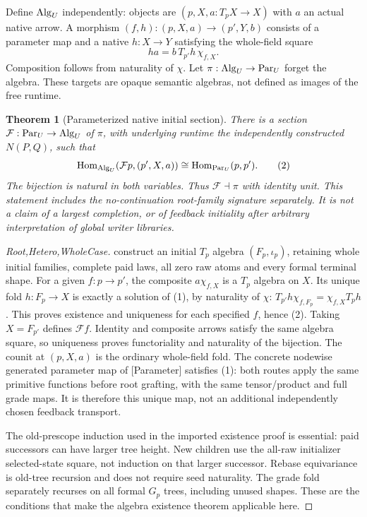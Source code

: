 \documentclass[11pt]{article}
\newtheorem{theorem}{Theorem}\newtheorem{lemma}[theorem]{Lemma}\newtheorem{proposition}[theorem]{Proposition}
\begin{document}
Define $\operatorname{Alg}_U$ independently: objects are $(p,X,a:T_pX\to X)$ with $a$ an actual native arrow. A morphism $(f,h):(p,X,a)\to(p',Y,b)$ consists of a parameter map and a native $h:X\to Y$ satisfying the whole-field square
\[
 h a=b\,T_{p'}h\,\chi_{f,X}.                         \tag{1}
\]
Composition follows from naturality of $\chi$. Let $\pi:\operatorname{Alg}_U\to\operatorname{Par}_U$ forget the algebra. These targets are opaque semantic algebras, not defined as images of the free runtime.

\begin{theorem}[Parameterized native initial section]
There is a section $\mathcal F:\operatorname{Par}_U\to\operatorname{Alg}_U$ of $\pi$, with underlying runtime the independently constructed $N(P,Q)$, such that
\[
 \operatorname{Hom}_{\operatorname{Alg}_U}(\mathcal Fp,(p',X,a))
 \cong \operatorname{Hom}_{\operatorname{Par}_U}(p,p') .             \tag{2}
\]
The bijection is natural in both variables. Thus $\mathcal F\dashv\pi$ with identity unit. This statement includes the no-continuation root-family signature separately. It is not a claim of a largest completion, or of feedback initiality after arbitrary interpretation of global writer libraries.
\end{theorem}
\begin{proof}
[Root,Hetero,WholeCase] construct an initial $T_p$ algebra $(F_p,\iota_p)$, retaining whole initial families, complete paid laws, all zero raw atoms and every formal terminal shape. For a given $f:p\to p'$, the composite $a\chi_{f,X}$ is a $T_p$ algebra on $X$. Its unique fold $h:F_p\to X$ is exactly a solution of (1), by naturality of $\chi$:
$T_{p'}h\chi_{f,F_p}=\chi_{f,X}T_ph$.
This proves existence and uniqueness for each specified $f$, hence (2). Taking $X=F_{p'}$ defines $\mathcal Ff$. Identity and composite arrows satisfy the same algebra square, so uniqueness proves functoriality and naturality of the bijection. The counit at $(p,X,a)$ is the ordinary whole-field fold. The concrete nodewise generated parameter map of [Parameter] satisfies (1): both routes apply the same primitive functions before root grafting, with the same tensor/product and full grade maps. It is therefore this unique map, not an additional independently chosen feedback transport.

The old-prescope induction used in the imported existence proof is essential: paid successors can have larger tree height. New children use the all-raw initializer selected-state square, not induction on that larger successor. Rebase equivariance is old-tree recursion and does not require seed naturality. The grade fold separately recurses on all formal $G_p$ trees, including unused shapes. These are the conditions that make the algebra existence theorem applicable here.
\end{proof}
\end{document}

